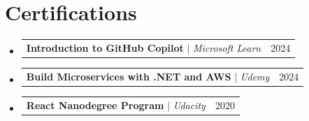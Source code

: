 \documentclass[letterpaper,11pt]{article}
\makeatletter
\newcommand{\resumeProjectHeading}[2]{
    \item
    \begin{tabular*}{0.97\textwidth}{l@{\extracolsep{\fill}}r}
      \small#1 & #2 \\
    \end{tabular*}\vspace{-5pt}
}
\newcommand{\resumeSubHeadingListStart}{\begin{itemize}[leftmargin=0.15in, label={}]}
\newcommand{\resumeSubHeadingListEnd}{\end{itemize}}
\makeatother
\begin{document}
\section{Certifications}
  \resumeSubHeadingListStart
    \resumeProjectHeading
        {\textbf{Introduction to GitHub Copilot} $|$ \emph{Microsoft Learn}}{2024}
    \resumeProjectHeading
        {\textbf{Build Microservices with .NET and AWS} $|$ \emph{Udemy}}{2024}
    \resumeProjectHeading
        {\textbf{React Nanodegree Program} $|$ \emph{Udacity}}{2020}
  \resumeSubHeadingListEnd

\end{document}
